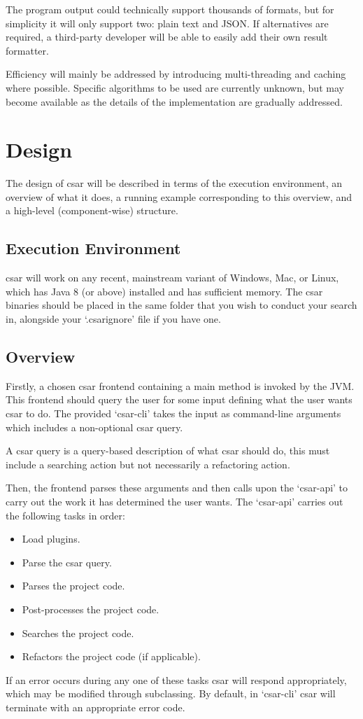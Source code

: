 \documentclass[12pt, letterpaper]{article}
\begin{document}
The program output could technically support thousands of formats, but for simplicity it will only support two: plain text and JSON.
If alternatives are required, a third-party developer will be able to easily add their own result formatter.

Efficiency will mainly be addressed by introducing multi-threading and caching where possible.
Specific algorithms to be used are currently unknown, but may become available as the details of the implementation are gradually addressed.

\section{Design}

The design of csar will be described in terms of the execution environment, an overview of what it does, a running example corresponding to this overview, and a high-level (component-wise) structure.

\subsection{Execution Environment}
csar will work on any recent, mainstream variant of Windows, Mac, or Linux, which has Java 8 (or above) installed and has sufficient memory.
The csar binaries should be placed in the same folder that you wish to conduct your search in, alongside your `.csarignore' file if you have one.

\subsection{Overview}
Firstly, a chosen csar frontend containing a main method is invoked by the JVM.
This frontend should query the user for some input defining what the user wants csar to do.
The provided `csar-cli' takes the input as command-line arguments which includes a non-optional csar query.

A csar query is a query-based description of what csar should do, this must include a searching action but not necessarily a refactoring action.

Then, the frontend parses these arguments and then calls upon the `csar-api' to carry out the work it has determined the user wants.
The `csar-api' carries out the following tasks in order:
\begin{itemize}
  \item Load plugins.
  \item Parse the csar query.
  \item Parses the project code.
  \item Post-processes the project code.
  \item Searches the project code.
  \item Refactors the project code (if applicable).
\end{itemize}
If an error occurs during any one of these tasks csar will respond appropriately, which may be modified through subclassing.
By default, in `csar-cli' csar will terminate with an appropriate error code.
\end{document}
